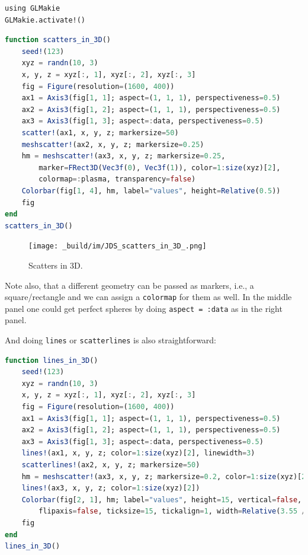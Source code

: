 \documentclass[
  notoc %
]{tufte-book}
\newcommand{\passthrough}[1]{#1}
\begin{document}
\begin{lstlisting}
using GLMakie
GLMakie.activate!()
\end{lstlisting}

\begin{lstlisting}[language=Julia]
function scatters_in_3D()
    seed!(123)
    xyz = randn(10, 3)
    x, y, z = xyz[:, 1], xyz[:, 2], xyz[:, 3]
    fig = Figure(resolution=(1600, 400))
    ax1 = Axis3(fig[1, 1]; aspect=(1, 1, 1), perspectiveness=0.5)
    ax2 = Axis3(fig[1, 2]; aspect=(1, 1, 1), perspectiveness=0.5)
    ax3 = Axis3(fig[1, 3]; aspect=:data, perspectiveness=0.5)
    scatter!(ax1, x, y, z; markersize=50)
    meshscatter!(ax2, x, y, z; markersize=0.25)
    hm = meshscatter!(ax3, x, y, z; markersize=0.25,
        marker=FRect3D(Vec3f(0), Vec3f(1)), color=1:size(xyz)[2],
        colormap=:plasma, transparency=false)
    Colorbar(fig[1, 4], hm, label="values", height=Relative(0.5))
    fig
end
scatters_in_3D()
\end{lstlisting}

\begin{figure}
\hypertarget{fig:scatters_in_3D}{%
\centering
\texttt{[image: \_build/im/JDS\_scatters\_in\_3D\_.png]}
\caption{Scatters in 3D.}\label{fig:scatters_in_3D}
}
\end{figure}

Note also, that a different geometry can be passed as markers, i.e., a
square/rectangle and we can assign a \passthrough{\lstinline!colormap!}
for them as well. In the middle panel one could get perfect spheres by
doing \passthrough{\lstinline!aspect = :data!} as in the right panel.

And doing \passthrough{\lstinline!lines!} or
\passthrough{\lstinline!scatterlines!} is also straightforward:

\begin{lstlisting}[language=Julia]
function lines_in_3D()
    seed!(123)
    xyz = randn(10, 3)
    x, y, z = xyz[:, 1], xyz[:, 2], xyz[:, 3]
    fig = Figure(resolution=(1600, 400))
    ax1 = Axis3(fig[1, 1]; aspect=(1, 1, 1), perspectiveness=0.5)
    ax2 = Axis3(fig[1, 2]; aspect=(1, 1, 1), perspectiveness=0.5)
    ax3 = Axis3(fig[1, 3]; aspect=:data, perspectiveness=0.5)
    lines!(ax1, x, y, z; color=1:size(xyz)[2], linewidth=3)
    scatterlines!(ax2, x, y, z; markersize=50)
    hm = meshscatter!(ax3, x, y, z; markersize=0.2, color=1:size(xyz)[2])
    lines!(ax3, x, y, z; color=1:size(xyz)[2])
    Colorbar(fig[2, 1], hm; label="values", height=15, vertical=false,
        flipaxis=false, ticksize=15, tickalign=1, width=Relative(3.55 / 4))
    fig
end
lines_in_3D()
\end{lstlisting}
\end{document}

